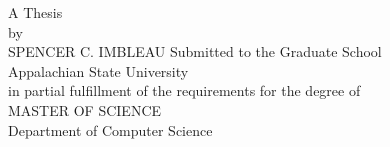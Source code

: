 \vspace*{0.5in}
\vfill
\begin{center}
\begin{spacing}{1.1}
\begin{adjustwidth}{2cm}{2cm}
\begin{center}
\large{\thesistitle}
\end{center}
\end{adjustwidth}
\end{spacing}
\normalsize
\vfill
A Thesis\\
by\\
SPENCER C. IMBLEAU
\vfill
Submitted to the Graduate School\\
Appalachian State University\\
in partial fulfillment of the requirements for the degree of\\
MASTER OF SCIENCE
\vfill
\graduationdate\\
Department of Computer Science
\end{center}
\vfill

\thispagestyle{empty}
\clearpage